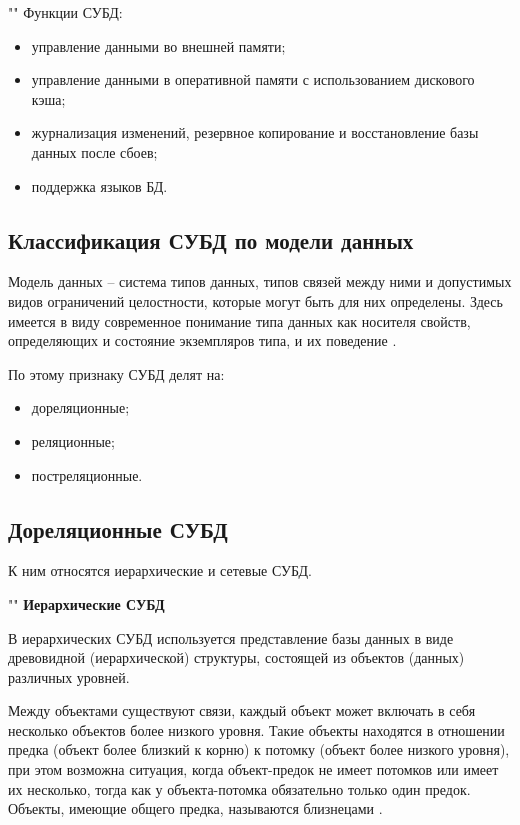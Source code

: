 \documentclass{bmstu}
\begin{document}
""\newline
Функции СУБД:

\begin{itemize}
	\setlength\itemsep{0.01em}
	\item управление данными во внешней памяти;
	\item управление данными в оперативной памяти с использованием дискового кэша;
	\item журнализация изменений, резервное копирование и восстановление базы данных после сбоев;
	\item поддержка языков БД.
\end{itemize}

\subsection{Классификация СУБД по модели данных}

Модель данных --  система типов данных, типов связей между ними и допустимых видов ограничений целостности, которые могут быть для них определены. Здесь имеется в виду современное понимание типа данных как носителя свойств, определяющих и состояние экземпляров типа, и их поведение \cite{kogal}.

По этому признаку СУБД делят на:

\begin{itemize}
	\setlength\itemsep{0.01em}
	\item дореляционные;
	\item реляционные;
	\item постреляционные.
\end{itemize}


\subsection*{Дореляционные СУБД}

К ним относятся иерархические и сетевые СУБД.

""\newline
\noindent\textbf{Иерархические СУБД}

В иерархических СУБД используется представление базы данных в виде древовидной (иерархической) структуры, состоящей из объектов (данных) различных уровней.

Между объектами существуют связи, каждый объект может включать в себя несколько объектов более низкого уровня. Такие объекты находятся в отношении предка (объект более близкий к корню) к потомку (объект более низкого уровня), при этом возможна ситуация, когда объект-предок не имеет потомков или имеет их несколько, тогда как у объекта-потомка обязательно только один предок. Объекты, имеющие общего предка, называются близнецами \cite{scienceforum}.
\end{document}
